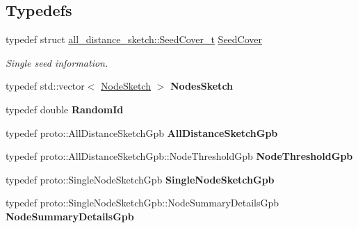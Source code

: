 \subsection*{Typedefs}
\begin{DoxyCompactItemize}
\item 
typedef struct \hyperlink{structall__distance__sketch_1_1SeedCover__t}{all\+\_\+distance\+\_\+sketch\+::\+Seed\+Cover\+\_\+t} \hyperlink{namespaceall__distance__sketch_a2c159e46ed1a101b68cb2b23a58c4129}{Seed\+Cover}
\begin{DoxyCompactList}\small\item\em Single seed information. \end{DoxyCompactList}\item 
\hypertarget{namespaceall__distance__sketch_aa6fb9f0cba2c34476603e744606c5d6a}{}typedef std\+::vector$<$ \hyperlink{classall__distance__sketch_1_1NodeSketch}{Node\+Sketch} $>$ {\bfseries Nodes\+Sketch}\label{namespaceall__distance__sketch_aa6fb9f0cba2c34476603e744606c5d6a}

\item 
\hypertarget{namespaceall__distance__sketch_a07dc7ca615a83c4e656f52297eda4bb4}{}typedef double {\bfseries Random\+Id}\label{namespaceall__distance__sketch_a07dc7ca615a83c4e656f52297eda4bb4}

\item 
\hypertarget{namespaceall__distance__sketch_a5c92a8ad66531df4f1690f8fb4f96426}{}typedef proto\+::\+All\+Distance\+Sketch\+Gpb {\bfseries All\+Distance\+Sketch\+Gpb}\label{namespaceall__distance__sketch_a5c92a8ad66531df4f1690f8fb4f96426}

\item 
\hypertarget{namespaceall__distance__sketch_a670d91fdbfca59a9cd101180703f5349}{}typedef proto\+::\+All\+Distance\+Sketch\+Gpb\+::\+Node\+Threshold\+Gpb {\bfseries Node\+Threshold\+Gpb}\label{namespaceall__distance__sketch_a670d91fdbfca59a9cd101180703f5349}

\item 
\hypertarget{namespaceall__distance__sketch_a303e4823d16b1292aae19bffa3fcd302}{}typedef proto\+::\+Single\+Node\+Sketch\+Gpb {\bfseries Single\+Node\+Sketch\+Gpb}\label{namespaceall__distance__sketch_a303e4823d16b1292aae19bffa3fcd302}

\item 
\hypertarget{namespaceall__distance__sketch_ad8c3eac40af697c88f1f50bd46d985ec}{}typedef proto\+::\+Single\+Node\+Sketch\+Gpb\+::\+Node\+Summary\+Details\+Gpb {\bfseries Node\+Summary\+Details\+Gpb}\label{namespaceall__distance__sketch_ad8c3eac40af697c88f1f50bd46d985ec}


\end{DoxyCompactItemize}
